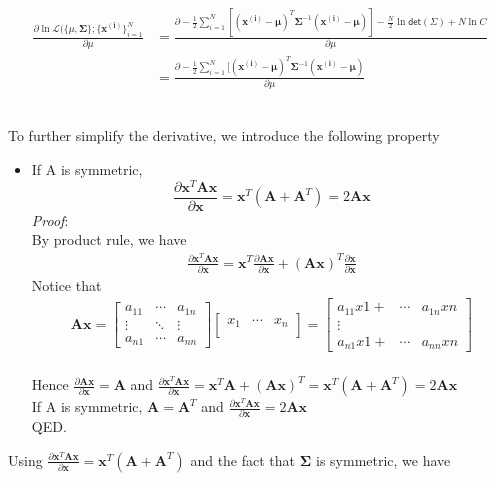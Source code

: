 \documentclass[11pt]{article}
\begin{document}
{\begin{equation}
    \begin{split}
        \frac{\partial  { \ln \mathcal{L}( \{ \mu, \mathbf{\Sigma} \}; \{ \mathbf{x^{(i)}}\}_{i = 1}^N}}{\partial \mu} &= \frac{\partial -\frac{1}{2}\sum\limits_{i=1}^N [( \mathbf{x^{(i)}} - \mathbf{\mu})^T
	 	\mathbf{\Sigma}^{-1} ( \mathbf{x^{(i)}} - \mathbf{\mu})]-\frac{N}{2}\ln\mathsf{det}(\Sigma) + N\ln C}{\partial \mu}\\
	 	&= \frac{\partial  -\frac{1}{2}\sum\limits_{i=1}^N [( \mathbf{x^{(i)}} - \mathbf{\mu})^T
	 	\mathbf{\Sigma}^{-1} ( \mathbf{x^{(i)}} - \mathbf{\mu})}{\partial \mu}
    \end{split}
\end{equation}

\ \\
To further simplify the derivative, we introduce the following property
\begin{itemize}
    \item If A is symmetric, $$ \frac{\partial \mathbf{x}^T\mathbf{A}\mathbf{x}}{\partial \mathbf{x}}=\mathbf{x}^T(\mathbf{A}+\mathbf{A}^T)=2\mathbf{Ax}$$
    \emph{Proof}:
    \ \\
    By product rule, we have
    \begin{gather*}
        \frac{\partial \mathbf{x}^T\mathbf{A}\mathbf{x}}{\partial \mathbf{x}}=\mathbf{x}^T\frac{\partial \mathbf{Ax}}{\partial \mathbf{x}}+(\mathbf{Ax})^T\frac{\partial \mathbf{x}}{\partial \mathbf{x}}
    \end{gather*}
    Notice that 
    \begin{gather*}
        \mathbf{Ax}=\begin{bmatrix}
a_{11}&\cdots &a_{1n} \\
\vdots &\ddots & \vdots\\
a_{n1}&\cdots &a_{nn}
\end{bmatrix}\begin{bmatrix}
x_{1}&\cdots &x_{n} \\
\end{bmatrix}=\begin{bmatrix}
a_{11}x{1}+&\cdots &a_{1n}x{n} \\
\vdots\\
a_{n1}x{1}+&\cdots &a_{nn}x{n}
\end{bmatrix}
    \end{gather*}
\ \\
Hence $\frac{\partial \mathbf{Ax}}{\partial \mathbf{x}}=\mathbf{A}$ and $\frac{\partial \mathbf{x}^T\mathbf{A}\mathbf{x}}{\partial \mathbf{x}}=\mathbf{x}^T\mathbf{A
}+(\mathbf{Ax})^T=\mathbf{x}^T(\mathbf{A}+\mathbf{A}^T)=2\mathbf{Ax}$
\ \\
If A is symmetric, $\mathbf{A}=\mathbf{A}^T$ and $\frac{\partial \mathbf{x}^T\mathbf{A}\mathbf{x}}{\partial \mathbf{x}}=2\mathbf{Ax}$
\ \\
QED.
\end{itemize}
Using $ \frac{\partial \mathbf{x}^T\mathbf{A}\mathbf{x}}{\partial \mathbf{x}}=\mathbf{x}^T(\mathbf{A}+\mathbf{A}^T)$ and the fact that $\mathbf{\Sigma}$ is symmetric, we have

}
\end{document}
